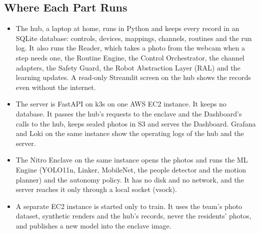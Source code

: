 \documentclass[conference]{IEEEtran}
\begin{document}
\subsection{Where Each Part Runs}
\begin{itemize}
\item The hub, a laptop at home, runs in Python and keeps every record in an SQLite database: controls, devices, mappings, channels, routines and the run log. It also runs the Reader, which takes a photo from the webcam when a step needs one, the Routine Engine, the Control Orchestrator, the channel adapters, the Safety Guard, the Robot Abstraction Layer (RAL) and the learning updates. A read-only Streamlit screen on the hub shows the records even without the internet.
\item The server is FastAPI on k3s on one AWS EC2 instance. It keeps no database. It passes the hub's requests to the enclave and the Dashboard's calls to the hub, keeps sealed photos in S3 and serves the Dashboard. Grafana and Loki on the same instance show the operating logs of the hub and the server.
\item The Nitro Enclave on the same instance opens the photos and runs the ML Engine (YOLO11n, Linker, MobileNet, the people detector and the motion planner) and the autonomy policy. It has no disk and no network, and the server reaches it only through a local socket (vsock).
\item A separate EC2 instance is started only to train. It uses the team's photo dataset, synthetic renders and the hub's records, never the residents' photos, and publishes a new model into the enclave image.
\end{itemize}
\end{document}
